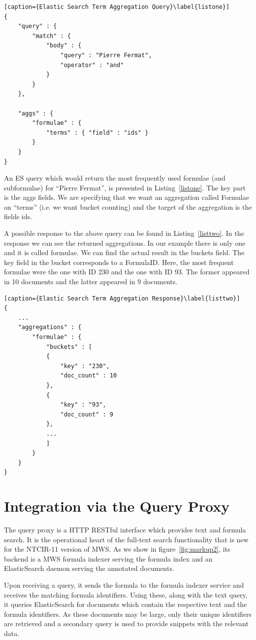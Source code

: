 \documentclass{deliverablereport}
\begin{document}
\begin{lstlisting}[caption={Elastic Search Term Aggregation Query}\label{listone}]
{
	"query" : {
		"match" : {
			"body" : {
				"query" : "Pierre Fermat",
				"operator" : "and"
			}
		}
	},

	"aggs" : {
		"formulae" : {
			"terms" : { "field" : "ids" }
		}
	}
}

\end{lstlisting}

An ES query which would return the most frequently used formulae (and subformulae) for
“Pierre Fermat”, is presented in Listing~\ref{listone}. The key part is the aggs fields. We are
specifying that we want an aggregation called Formulae on “terms” (i.e. we want bucket
counting) and the target of the aggregation is the fields ids. 

A possible response to the above query can be found in Listing~\ref{listtwo}. In the response we can
see the returned aggregations. In our example there is only one and it is called
formulae. We can find the actual result in the buckets field. The key field in the bucket
corresponds to a FormulaID. Here, the most frequent formulae were the one with ID 230 and
the one with ID 93. The former appeared in 10 documents and the latter appeared in 9
documents.

\begin{lstlisting}[caption={Elastic Search Term Aggregation Response}\label{listtwo}]
{
	...
	"aggregations" : {
		"formulae" : {
			"buckets" : [
			{
				"key" : "230",
				"doc_count" : 10
			},
			{
				"key" : "93",
				"doc_count" : 9
			},
			...
			]
		}
	}
}
\end{lstlisting}

\section{Integration via the Query Proxy}\label{sec:proxy}

The query proxy is a HTTP RESTful interface which provides text and formula search. It is the operational heart of the full-text search functionality that is new for the NTCIR-11 version of MWS. As we show in figure~\ref{fig:markup2}, its backend is a MWS formula indexer serving the formula index and an ElasticSearch daemon serving the annotated documents. 

Upon receiving a query, it sends the formula to the formula indexer service and receives the matching formula identifiers. Using these, along with the text query, it queries ElasticSearch for documents which contain the respective text and the formula identifiers. As these documents may be large, only their unique identifiers are retrieved and a secondary query is used to provide snippets with the relevant data. 
\end{document}
